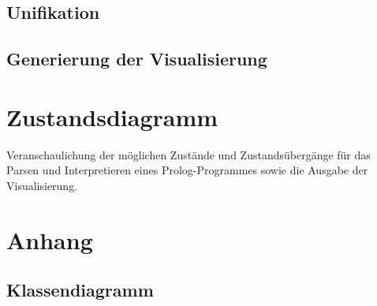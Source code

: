 \documentclass[parskip=full,11pt,twoside]{scrartcl}
\begin{document}
\subsection{Unifikation}

\subsection{Generierung der Visualisierung}

\section{Zustandsdiagramm}
Veranschaulichung der möglichen Zustände und Zustandsübergänge für das Parsen und Interpretieren eines Prolog-Programmes sowie die Ausgabe der Visualisierung.

\appendix

\section{Anhang}

\subsection{Klassendiagramm}
\end{document}
